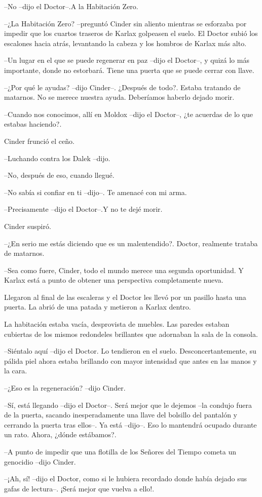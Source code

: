 --No --dijo el Doctor--.A la Habitación Zero.

--¿La Habitación Zero? --preguntó Cinder sin aliento mientras se esforzaba por impedir que los cuartos traseros de Karlax golpeasen el suelo. El Doctor subió los escalones hacia atrás, levantando la cabeza y los hombros de Karlax más alto.

--Un lugar en el que se puede regenerar en paz --dijo el Doctor--, y quizá lo más importante, donde no estorbará. Tiene una puerta que se puede cerrar con llave.

--¿Por qué le ayudas? --dijo Cinder--. ¿Después de todo?. Estaba tratando de matarnos. No se merece nuestra ayuda. Deberíamos haberlo dejado morir.

--Cuando nos conocimos, allí en Moldox --dijo el Doctor--, ¿te acuerdas de lo que estabas haciendo?.



Cinder frunció el ceño. 

--Luchando contra los Dalek --dijo.

--No, después de eso, cuando llegué.

--No sabía si confiar en ti --dijo--. Te amenacé con mi arma.

--Precisamente --dijo el Doctor--.Y no te dejé morir.



Cinder suspiró. 



--¿En serio me estás diciendo que es un malentendido?. Doctor, realmente trataba de matarnos.

--Sea como fuere, Cinder, todo el mundo merece una segunda oportunidad. Y Karlax está a punto de obtener una perspectiva completamente nueva. 



Llegaron al final de las escaleras y el Doctor les llevó por un pasillo hasta una puerta. La abrió de una patada y metieron a Karlax dentro.

La habitación estaba vacía, desprovista de muebles. Las paredes estaban cubiertas de los mismos redondeles brillantes que adornaban la sala de la consola. 



--Siéntalo aquí --dijo el Doctor. Lo tendieron en el suelo. Desconcertantemente, su pálida piel ahora estaba brillando con mayor intensidad que antes en las manos y la cara.

--¿Eso es la regeneración? --dijo Cinder.

--Sí, está llegando --dijo el Doctor--. Será mejor que le dejemos --la condujo fuera de la puerta, sacando inesperadamente una llave del bolsillo del pantalón y cerrando la puerta tras ellos--. Ya está --dijo--. Eso lo mantendrá ocupado durante un rato. Ahora, ¿dónde estábamos?.

--A punto de impedir que una flotilla de los Señores del Tiempo cometa un genocidio --dijo Cinder.

--¡Ah, sí! --dijo el Doctor, como si le hubiera recordado donde había dejado sus gafas de lectura--. ¡Será mejor que vuelva a ello!.



